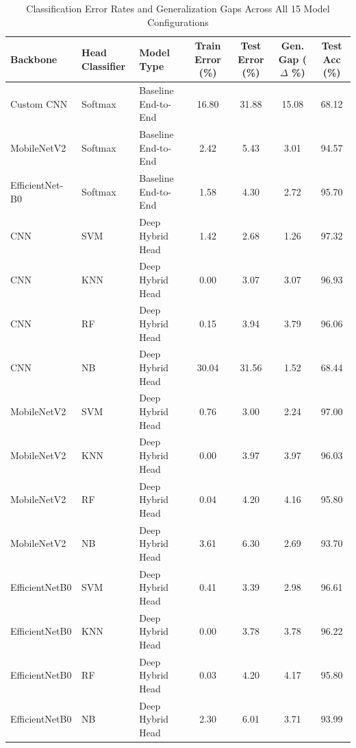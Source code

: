 \begin{table}[htbp]
\caption{Classification Error Rates and Generalization Gaps Across All 15 Model Configurations}
\label{tab:generalization_gap}
\centering
\small
\begin{tabular}{lllcccc}
\toprule
\textbf{Backbone} & \textbf{Head Classifier} & \textbf{Model Type} & \textbf{Train Error (\%)} & \textbf{Test Error (\%)} & \textbf{Gen. Gap ($\Delta$ \%)} & \textbf{Test Acc (\%)} \\
\midrule
Custom CNN & Softmax & Baseline End-to-End & 16.80 & 31.88 & 15.08 & 68.12 \\
MobileNetV2 & Softmax & Baseline End-to-End & 2.42 & 5.43 & 3.01 & 94.57 \\
EfficientNet-B0 & Softmax & Baseline End-to-End & 1.58 & 4.30 & 2.72 & 95.70 \\
CNN & SVM & Deep Hybrid Head & 1.42 & 2.68 & 1.26 & 97.32 \\
CNN & KNN & Deep Hybrid Head & 0.00 & 3.07 & 3.07 & 96.93 \\
CNN & RF & Deep Hybrid Head & 0.15 & 3.94 & 3.79 & 96.06 \\
CNN & NB & Deep Hybrid Head & 30.04 & 31.56 & 1.52 & 68.44 \\
MobileNetV2 & SVM & Deep Hybrid Head & 0.76 & 3.00 & 2.24 & 97.00 \\
MobileNetV2 & KNN & Deep Hybrid Head & 0.00 & 3.97 & 3.97 & 96.03 \\
MobileNetV2 & RF & Deep Hybrid Head & 0.04 & 4.20 & 4.16 & 95.80 \\
MobileNetV2 & NB & Deep Hybrid Head & 3.61 & 6.30 & 2.69 & 93.70 \\
EfficientNetB0 & SVM & Deep Hybrid Head & 0.41 & 3.39 & 2.98 & 96.61 \\
EfficientNetB0 & KNN & Deep Hybrid Head & 0.00 & 3.78 & 3.78 & 96.22 \\
EfficientNetB0 & RF & Deep Hybrid Head & 0.03 & 4.20 & 4.17 & 95.80 \\
EfficientNetB0 & NB & Deep Hybrid Head & 2.30 & 6.01 & 3.71 & 93.99 \\
\bottomrule
\end{tabular}
\end{table}